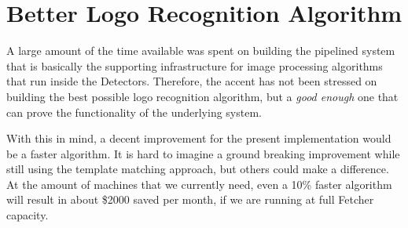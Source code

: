 \section{Better Logo Recognition Algorithm}

A large amount of the time available was spent on building the pipelined
system that is basically the supporting infrastructure for image processing
algorithms that run inside the Detectors. Therefore, the accent has not been
stressed on building the best possible logo recognition algorithm, but a
\textit{good enough} one that can prove the functionality of the underlying
system.

With this in mind, a decent improvement for the present implementation would
be a faster algorithm. It is hard to imagine a ground breaking improvement
while still using the template matching approach, but others could make a
difference. At the amount of machines that we currently need, even a 10\%
faster algorithm will result in about \$2000 saved per month, if we are
running at full Fetcher capacity.
